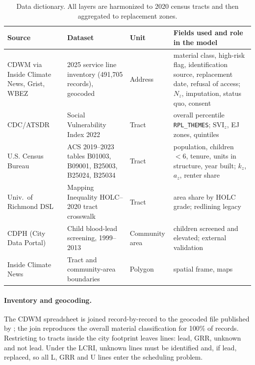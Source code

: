 \documentclass[11pt]{article}
\newcommand{\SVI}{\mathrm{SVI}}
\begin{document}
\begin{table}[t]\centering\footnotesize
\caption{Data dictionary. All layers are harmonized to 2020 census tracts and then aggregated to
replacement zones.}\label{tab:dict}
\begin{tabularx}{\linewidth}{@{}>{\raggedright}p{2.7cm}>{\raggedright}p{3.1cm}p{1.3cm}>{\raggedright\arraybackslash}X@{}}
\toprule
Source & Dataset & Unit & Fields used and role in the model\\
\midrule
CDWM via Inside Climate News, Grist, WBEZ & 2025 service line inventory (491,705 records), geocoded & Address & material class, high-risk flag, identification source, replacement date, refusal of access; $N_z$, imputation, status quo, consent\\
CDC/ATSDR & Social Vulnerability Index 2022 & Tract & overall percentile \texttt{RPL\_THEMES}; $\SVI_z$, EJ zones, quintiles\\
U.S. Census Bureau & ACS 2019--2023 tables B01003, B09001, B25003, B25024, B25034 & Tract & population, children $<6$, tenure, units in structure, year built; $k_z$, $a_z$, renter share\\
Univ.\ of Richmond DSL & Mapping Inequality HOLC--2020 tract crosswalk & Tract & area share by HOLC grade; redlining legacy\\
CDPH (City Data Portal) & Child blood-lead screening, 1999--2013 & Community area & children screened and elevated; external validation\\
Inside Climate News & Tract and community-area boundaries & Polygon & spatial frame, maps\\
\bottomrule
\end{tabularx}
\end{table}

\paragraph{Inventory and geocoding.} The CDWM spreadsheet is joined record-by-record to the
geocoded file published by \citet{icn2025data}; the join reproduces the overall material
classification for 100\% of records. Restricting to tracts inside the city footprint leaves
\NLines{} lines: \NL{} lead, \NGRR{} GRR, \NU{} unknown and \NNL{} not lead. Under the LCRI,
unknown lines must be identified and, if lead, replaced, so all \NAction{} L, GRR and U lines enter
the scheduling problem.
\end{document}
